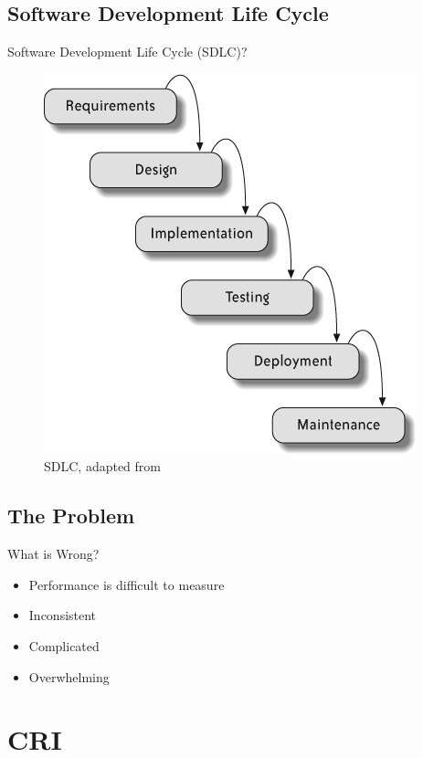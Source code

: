     \subsection[SDLC]{Software Development Life Cycle}
        \begin{frame}{Software Development Life Cycle (SDLC)?}
            \begin{figure}[ht]
                \centering
                \includegraphics[scale=.86]{images/waterfall.png}
                \caption{SDLC, adapted from \cite{Hibbs2009} }
            \end{figure}
        \end{frame}
    
    \subsection{The Problem}
        \begin{frame}{What is Wrong?}
            \begin{itemize}
                \item Performance is difficult to measure
                \item Inconsistent
                \item Complicated
                \item Overwhelming
            \end{itemize}
        \end{frame}
    
\section{CRI}

